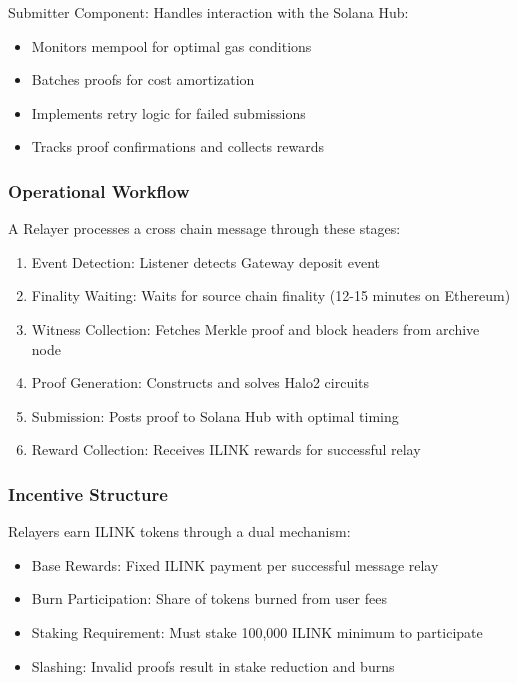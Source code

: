 \documentclass[11pt,a4paper]{article}
\begin{document}
Submitter Component: Handles interaction with the Solana Hub:
\begin{itemize}
    \item Monitors mempool for optimal gas conditions
    \item Batches proofs for cost amortization
    \item Implements retry logic for failed submissions
    \item Tracks proof confirmations and collects rewards
\end{itemize}

\subsubsection*{Operational Workflow}

A Relayer processes a cross chain message through these stages:

\begin{enumerate}
    \item Event Detection: Listener detects Gateway deposit event
    \item Finality Waiting: Waits for source chain finality (12-15 minutes on Ethereum)
    \item Witness Collection: Fetches Merkle proof and block headers from archive node
    \item Proof Generation: Constructs and solves Halo2 circuits
    \item Submission: Posts proof to Solana Hub with optimal timing
    \item Reward Collection: Receives ILINK rewards for successful relay
\end{enumerate}

\subsubsection*{Incentive Structure}

Relayers earn ILINK tokens through a dual mechanism:
\begin{itemize}
    \item Base Rewards: Fixed ILINK payment per successful message relay
    \item Burn Participation: Share of tokens burned from user fees
    \item Staking Requirement: Must stake 100,000 ILINK minimum to participate
    \item Slashing: Invalid proofs result in stake reduction and burns
\end{itemize}
\end{document}
